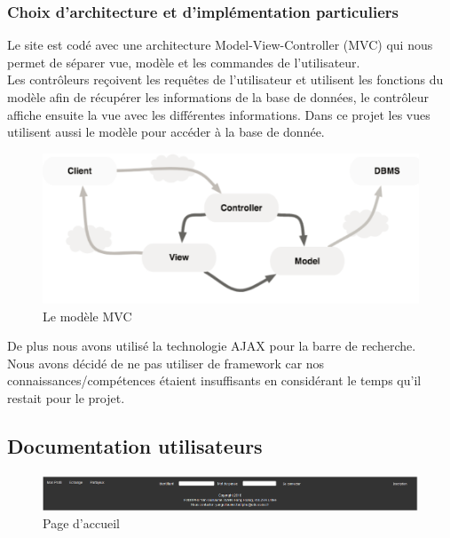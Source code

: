 \documentclass[a4paper,12pt,abstracton,titlepage]{scrartcl}
\begin{document}
\subsubsection{Choix d'architecture et d'implémentation particuliers}
Le site est codé avec une architecture Model-View-Controller (MVC) qui nous permet de séparer vue, modèle et les commandes de l'utilisateur.\\
Les contrôleurs reçoivent les requêtes de l'utilisateur et utilisent les fonctions du modèle afin de récupérer les informations de la base de données, le contrôleur affiche ensuite la vue avec les différentes informations. Dans ce projet les vues utilisent aussi le modèle pour accéder à la base de donnée.\\
\begin{figure}[h]
  \centering
    \includegraphics[width=\textwidth]{./doc/mvc.png}
	\caption{Le modèle MVC}
	\label{mvc}
\end{figure}

De plus nous avons utilisé la technologie AJAX pour la barre de recherche.\\
Nous avons décidé de ne pas utiliser de framework car nos connaissances/compétences étaient insuffisants en considérant le temps qu'il restait pour le projet.\\

\newpage
\subsection{Documentation utilisateurs}
\begin{figure}[h]
  \centering
    \includegraphics[width=\textwidth]{./doc/01_startscreen.png}
	\caption{Page d'accueil}
	\label{pdacc}
\end{figure}
\end{document}
